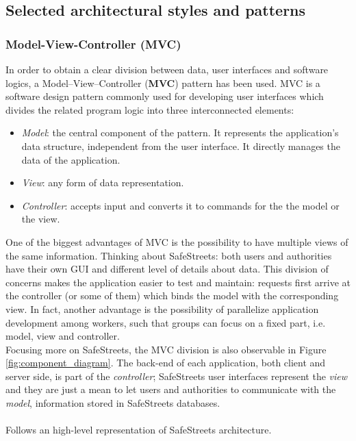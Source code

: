 \documentclass{article}
\begin{document}
		\clearpage	
		\subsection{Selected architectural styles and patterns}
			\subsubsection{Model-View-Controller (MVC)}
				In order to obtain a clear division between data, user interfaces and software logics, a
				Model–View–Controller (\textbf{MVC}) pattern has been used. MVC is a software design pattern commonly used for developing user interfaces which divides the related program logic into three interconnected elements:
				
				\begin{itemize}
					\item \textit{Model}: the central component of the pattern. It represents the application's data structure, independent from the user interface. It directly manages the data of the application.
					\item \textit{View}: any form of data representation. 
					\item \textit{Controller}: accepts input and converts it to commands for the the model or the view.
				\end{itemize}
				
				One of the biggest advantages of MVC is the possibility to have multiple views of the same information. Thinking about SafeStreets: both users and authorities have their own GUI and different level of details about data.
				This division of concerns makes the application easier to test and maintain: requests first arrive at the controller (or some of them) which binds the model with the corresponding view. 
				In fact, another advantage is the possibility of parallelize application development among workers, such that groups can focus on a fixed part, i.e. model, view and controller.\\
				
				Focusing more on SafeStreets, the MVC division is also observable in Figure \ref{fig:component_diagram}. The back-end of each application, both client and server side, is part of the \textit{controller}; SafeStreets user interfaces represent the \textit{view} and they are just a mean to let users and authorities to communicate with the \textit{model}, information stored in SafeStreets databases.\\
				\\
				Follows an high-level representation of SafeStreets architecture.
				
\end{document}
